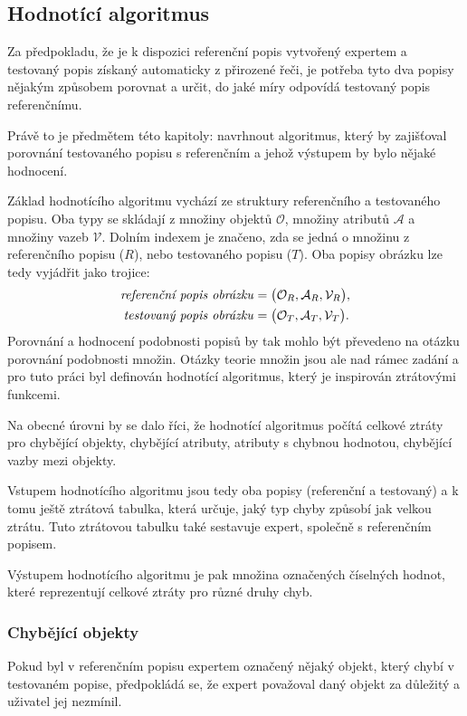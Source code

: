 \subsection{Hodnotící algoritmus}\label{subsec:hodnoceni}
Za předpokladu, že je k dispozici referenční popis vytvořený expertem a testovaný popis získaný automaticky z přirozené řeči,
je potřeba tyto dva popisy nějakým způsobem porovnat a určit, do jaké míry odpovídá testovaný popis referenčnímu.

Právě to je předmětem této kapitoly: navrhnout algoritmus, který by zajišťoval porovnání testovaného popisu s referenčním a jehož výstupem by bylo nějaké hodnocení.

Základ hodnotícího algoritmu vychází ze struktury referenčního a testovaného popisu.
Oba typy se skládají z množiny objektů $\mathcal O$, množiny atributů $\mathcal A$ a množiny vazeb $\mathcal V$.
Dolním indexem je značeno, zda se jedná o množinu z referenčního popisu ($R$), nebo testovaného popisu ($T$).
Oba popisy obrázku lze tedy vyjádřit jako trojice:
\begin{align*}
	\text{\emph{referenční popis obrázku}} & = \bigl( \mathcal{O}_{R}, \mathcal{A}_{R}, \mathcal{V}_{R} \bigr), \\
	\text{\emph{testovaný popis obrázku}}  & = \bigl( \mathcal{O}_{T}, \mathcal{A}_{T}, \mathcal{V}_{T} \bigr).
\end{align*}
Porovnání a hodnocení podobnosti popisů by tak mohlo být převedeno na otázku porovnání podobnosti množin.
Otázky teorie množin jsou ale nad rámec zadání a pro tuto práci byl definován hodnotící algoritmus,
který je inspirován ztrátovými funkcemi.

Na obecné úrovni by se dalo říci, že hodnotící algoritmus počítá celkové ztráty pro chybějící objekty,
chybějící atributy, atributy s chybnou hodnotou, chybějící vazby mezi objekty.

Vstupem hodnotícího algoritmu jsou tedy oba popisy (referenční a testovaný) a k tomu ještě ztrátová tabulka,
která určuje, jaký typ chyby způsobí jak velkou ztrátu.
Tuto ztrátovou tabulku také sestavuje expert, společně s referenčním popisem.

Výstupem hodnotícího algoritmu je pak množina označených číselných hodnot, které reprezentují celkové ztráty pro různé druhy chyb.

\newpage
\subsubsection{Chybějící objekty}
Pokud byl v referenčním popisu expertem označený nějaký objekt,
který chybí v testovaném popise, předpokládá se, že expert považoval daný objekt za důležitý a uživatel jej nezmínil.

